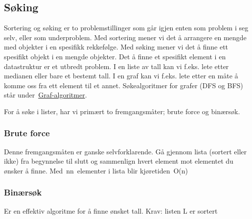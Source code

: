 \documentclass[12pt]{report}
\begin{document}
\vspace{\baselineskip}



\newpage

\vspace{\baselineskip}\setlength{\parskip}{6.0pt}
\subsection*{Søking}
\setlength{\parskip}{0.0pt}
Sortering og søking er to problemstillinger som går igjen enten som problem i seg selv, eller som underproblem. Med sortering mener vi det å arrangere en mengde med objekter i en spesifikk rekkefølge. Med søking mener vi det å finne ett spesifikt objekt i en mengde objekter. Det å finne et spesifikt element i en datastruktur er et utbredt problem. I en liste av tall kan vi f.eks. lete etter medianen eller bare et bestemt tall. I en graf kan vi f.eks. lete etter en måte å komme oss fra ett element til et annet. Søkealgoritmer for grafer (DFS og BFS) står under \href{https://www.wikipendium.no/TDT4120_Algoritmer_og_datastrukturer/nb/}{\textcolor[HTML]{006699}{Graf-algoritmer}}.\par

\setlength{\parskip}{10.56pt}
For å søke i lister, har vi primært to fremgangsmåter; brute force og binærsøk.\par


\vspace{\baselineskip}
\setlength{\parskip}{6.0pt}
\subsubsection*{Brute force}
\setlength{\parskip}{0.0pt}
Denne fremgangsmåten er ganske selvforklarende. Gå gjennom lista (sortert eller ikke) fra begynnelse til slutt og sammenlign hvert element mot elementet du ønsker å finne. Med nn elementer i lista blir kjøretiden O(n)\par


\vspace{\baselineskip}
\setlength{\parskip}{6.0pt}
\subsubsection*{Binærsøk}
\setlength{\parskip}{0.0pt}
Er en effektiv algoritme for å finne ønsket tall. Krav: listen L er sortert\par
\end{document}
